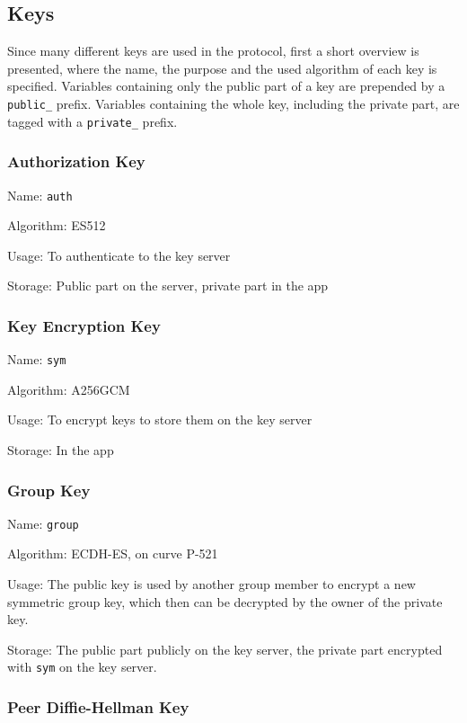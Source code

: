 \documentclass[a4paper, oneside]{discothesis}
\begin{document}
\subsection{Keys}

\label{sec:keys}

Since many different keys are used in the protocol, first a short overview is presented, where the name, the purpose and the used algorithm of each key is specified. Variables containing only the public part of a key are prepended by a \texttt{public\_} prefix. Variables containing the whole key, including the private part, are tagged with a \texttt{private\_} prefix.

\subsubsection{Authorization Key}

Name: \texttt{auth}

\noindent
Algorithm: ES512

\noindent
Usage: To authenticate to the key server

\noindent
Storage: Public part on the server, private part in the app

\subsubsection{Key Encryption Key}

Name: \texttt{sym}

\noindent
Algorithm: A256GCM

\noindent
Usage: To encrypt keys to store them on the key server

\noindent
Storage: In the app

\subsubsection{Group Key}

Name: \texttt{group}

\noindent
Algorithm: ECDH-ES, on curve P-521

\noindent
Usage: The public key is used by another group member to encrypt a new symmetric group key, which then can be decrypted by the owner of the private key.

\noindent
Storage: The public part publicly on the key server, the private part encrypted with \texttt{sym} on the key server.

\subsubsection{Peer Diffie-Hellman Key}
\end{document}

